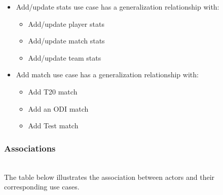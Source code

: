 \begin{itemize}
\item
\protect{}\label{AovziuTjnssP440Z8xGKR}
Add/update stats use case has a generalization relationship with:

\begin{itemize}
\item
Add/update player stats
\item
Add/update match stats
\item
Add/update team stats
\end{itemize}
\item
\protect{}\label{WiWguxpzyzPMhfNJXChFk}
Add match use case has a generalization relationship with:

\begin{itemize}
\item
Add T20 match
\item
Add an ODI match
\item
Add Test match
\end{itemize}
\end{itemize}

\subsubsection{Associations}\label{OjLBAVYYyLhgqam6vZs01}
\\
The table below illustrates the association between actors and their corresponding use cases.

